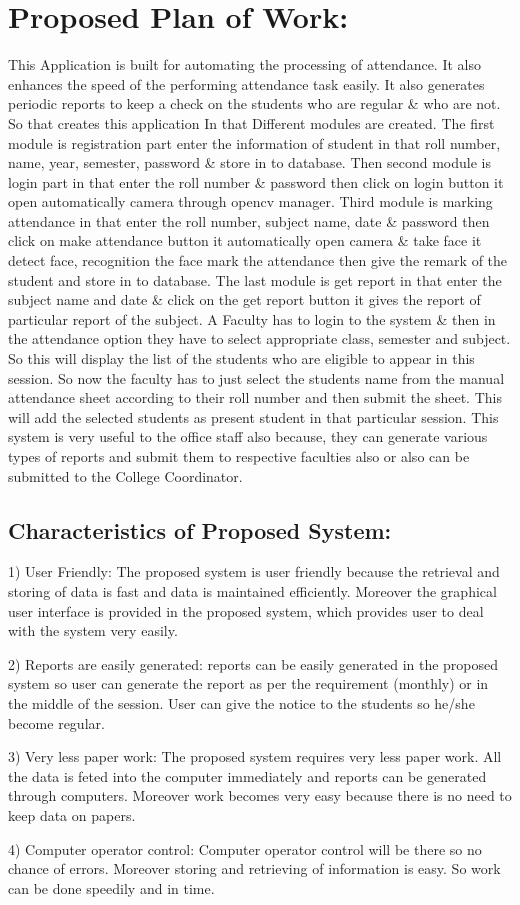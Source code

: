 \section{Proposed Plan of Work: }
This Application is built for automating the processing of attendance. It also enhances the speed of the performing attendance task easily. It also generates periodic reports to keep a check on the students who are regular \& who are not. So that creates this application In that Different modules are created. The first module is registration part enter the information of student in that roll number, name, year, semester, password \&  store in to database. Then second module is login part in that enter the roll number \& password then click on login button it open automatically camera through opencv manager. Third module is marking attendance in that enter the roll number, subject name, date \& password then click on make attendance button it automatically open camera \& take face it detect face, recognition the face mark the attendance then give the remark of the student and store in to database. The last module is get report in that enter the subject name and date \& click on the get report button it gives the report of particular report of the subject. A Faculty has to login to the system \& then in the attendance option they have to select appropriate class, semester and subject. So this will display the list of the students who are eligible to appear in this session. So now the faculty has to just select the students name from the manual attendance sheet according to their roll number and then submit the sheet. This will add the selected students as present student in that particular session. This system is very useful to the office staff also because, they can generate various types of reports and submit them to respective faculties also or also can be submitted to the College Coordinator. \cite{manju}

\newpage
\subsection{Characteristics of Proposed System:}
1) User Friendly: 
The proposed system is user friendly because the retrieval and storing of data is fast and data is maintained efficiently. Moreover the graphical user interface is provided in the proposed system, which provides user to deal with the system very easily. 

2) Reports are easily generated: 
reports can be easily generated in the proposed system so user can generate the report as per the requirement (monthly) or in the middle of the session. User can give the notice to the students so he/she become regular.

3) Very less paper work:
 The proposed system requires very less paper work. All the data is feted into the computer immediately and reports can be generated through computers. Moreover work becomes very easy because there is no need to keep data on papers.

4) Computer operator control:
 Computer operator control will be there so no chance of errors. Moreover storing and retrieving of information is easy. So work can be done speedily and in time.





